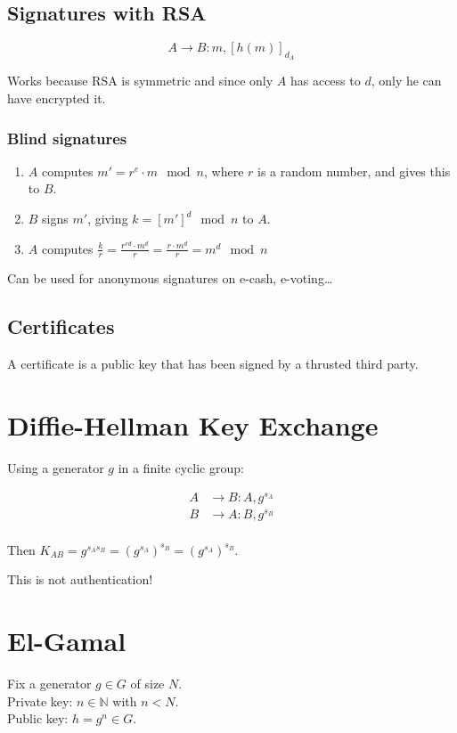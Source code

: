\documentclass{article}
\begin{document}
\subsection{Signatures with RSA}

\[
  A \longrightarrow B : m, [h(m)]_{d_A}
\]

Works because RSA is symmetric and since only $A$ has access to $d$, only he
can have encrypted it.

\subsubsection{Blind signatures}

\begin{enumerate}
  \item $A$ computes $m' = r^e \cdot m \mod n$, where $r$ is a random number, and gives
    this to $B$.
  \item $B$ signs $m'$, giving $k = [m']^d \mod n$ to $A$.
  \item $A$ computes $\frac{k}{r} = \frac{r^{ed} \cdot m^d}{r} = \frac{r \cdot m^d}{r} = m^d \mod n$
\end{enumerate}

Can be used for anonymous signatures on e-cash, e-voting\dots

\subsection{Certificates}
A certificate is a public key that has been signed by a thrusted third party.

\section{Diffie-Hellman Key Exchange}

Using a generator $g$ in a finite cyclic group:

\begin{align*}
  A &\longrightarrow B: A, g^{s_A} \\
  B &\longrightarrow A: B, g^{s_B} \\
\end{align*}

Then $K_{AB} = g^{s_A s_B} = (g^{s_A})^{s_B} = (g^{s_A})^{s_B}$.

This is not authentication!

\section{El-Gamal}
Fix a generator $g \in G$ of size $N$. \\
Private key: $n \in \mathbb{N}$ with $n < N$. \\
Public key: $h = g^n \in G$.
\end{document}
